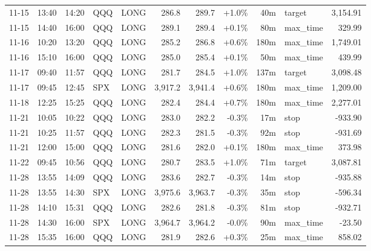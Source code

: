 \documentclass[11pt,a4paper,twoside]{article}
\begin{document}
\begin{center}
\begin{longtable}{>{\color{txtmain}}l l l l l r r r r >{\color{txtmain}}l r}
11-15 & 13:40 & 14:20 & QQQ & LONG & 286.8 & 289.7 & \textcolor{wingreen}{+1.0\%} & 40m & target & \textcolor{wingreen}{3,154.91} \\
11-15 & 14:40 & 16:00 & QQQ & LONG & 289.1 & 289.4 & \textcolor{wingreen}{+0.1\%} & 80m & max\_time & \textcolor{wingreen}{329.99} \\
11-16 & 10:20 & 13:20 & QQQ & LONG & 285.2 & 286.8 & \textcolor{wingreen}{+0.6\%} & 180m & max\_time & \textcolor{wingreen}{1,749.01} \\
11-16 & 15:10 & 16:00 & QQQ & LONG & 285.0 & 285.4 & \textcolor{wingreen}{+0.1\%} & 50m & max\_time & \textcolor{wingreen}{439.99} \\
11-17 & 09:40 & 11:57 & QQQ & LONG & 281.7 & 284.5 & \textcolor{wingreen}{+1.0\%} & 137m & target & \textcolor{wingreen}{3,098.48} \\
11-17 & 09:45 & 12:45 & SPX & LONG & 3,917.2 & 3,941.4 & \textcolor{wingreen}{+0.6\%} & 180m & max\_time & \textcolor{wingreen}{1,209.00} \\
11-18 & 12:25 & 15:25 & QQQ & LONG & 282.4 & 284.4 & \textcolor{wingreen}{+0.7\%} & 180m & max\_time & \textcolor{wingreen}{2,277.01} \\
11-21 & 10:05 & 10:22 & QQQ & LONG & 283.0 & 282.2 & \textcolor{lossred}{-0.3\%} & 17m & stop & \textcolor{lossred}{-933.90} \\
11-21 & 10:25 & 11:57 & QQQ & LONG & 282.3 & 281.5 & \textcolor{lossred}{-0.3\%} & 92m & stop & \textcolor{lossred}{-931.69} \\
11-21 & 12:00 & 15:00 & QQQ & LONG & 281.6 & 282.0 & \textcolor{wingreen}{+0.1\%} & 180m & max\_time & \textcolor{wingreen}{373.98} \\
11-22 & 09:45 & 10:56 & QQQ & LONG & 280.7 & 283.5 & \textcolor{wingreen}{+1.0\%} & 71m & target & \textcolor{wingreen}{3,087.81} \\
11-28 & 13:55 & 14:09 & QQQ & LONG & 283.6 & 282.7 & \textcolor{lossred}{-0.3\%} & 14m & stop & \textcolor{lossred}{-935.88} \\
11-28 & 13:55 & 14:30 & SPX & LONG & 3,975.6 & 3,963.7 & \textcolor{lossred}{-0.3\%} & 35m & stop & \textcolor{lossred}{-596.34} \\
11-28 & 14:10 & 15:31 & QQQ & LONG & 282.6 & 281.8 & \textcolor{lossred}{-0.3\%} & 81m & stop & \textcolor{lossred}{-932.71} \\
11-28 & 14:30 & 16:00 & SPX & LONG & 3,964.7 & 3,964.2 & \textcolor{lossred}{-0.0\%} & 90m & max\_time & \textcolor{lossred}{-23.50} \\
11-28 & 15:35 & 16:00 & QQQ & LONG & 281.9 & 282.6 & \textcolor{wingreen}{+0.3\%} & 25m & max\_time & \textcolor{wingreen}{858.02} \\

\end{longtable}
\end{center}
\end{document}
